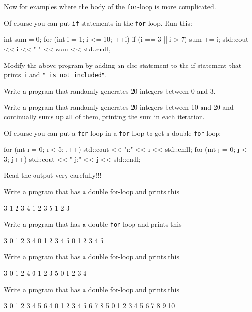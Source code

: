 \newpage{}

Now for examples where the body of the \texttt{for}-loop is more complicated.

Of course you can put \texttt{if}-statements in the \texttt{for}-loop. Run this:
\begin{console}
int sum = 0;
for (int i = 1; i <= 10; ++i)
{   
    if (i == 3 || i > 7)
    {
        sum += i;
        std::cout << i << " " << sum << std::endl;
    }
}
\end{console}

\begin{ex}
Modify the above program by adding an else statement to the if
statement that prints \texttt{i} and \texttt{" is not included"}.
\end{ex}

\begin{ex}
Write a program that randomly generates 20 integers
between 0 and 3.
\end{ex}

\begin{ex}
Write a program that randomly generates 20 integers
between 10 and 20 and continually sums up all of them, printing the sum
in each iteration.
\end{ex}
\newpage{}

Of course you can put a \texttt{for}-loop in a \texttt{for}-loop to get a double \texttt{for}-loop:
\begin{console}
for (int i = 0; i < 5; i++)
{   
    std::cout << "i:" << i << std::endl;
    for (int j = 0; j < 3; j++)
    {   
        std::cout << " j:" << j << std::endl;
    }
}
\end{console}
Read the output very carefully!!!

\begin{ex}
Write a program that has a double for-loop and prints
this
\begin{console}
3
  1 2 3
4
  1 2 3
5
  1 2 3 
\end{console}
\end{ex}

\begin{ex}
Write a program that has a double \texttt{for}-loop and prints this
\begin{console}
3
  0 1 2 3
4
  0 1 2 3 4
5
  0 1 2 3 4 5
\end{console}
\end{ex}

\begin{ex} Write a program that has a double for-loop and prints
this
\begin{console}
3
  0 1 2
4
  0 1 2 3
5
  0 1 2 3 4
\end{console}
\end{ex}
\begin{ex}
Write a program that has a double for-loop and prints this
\begin{console}
3
  0 1 2 3 4 5 6
4
  0 1 2 3 4 5 6 7 8
5
  0 1 2 3 4 5 6 7 8 9 10
\end{console}
\end{ex}

